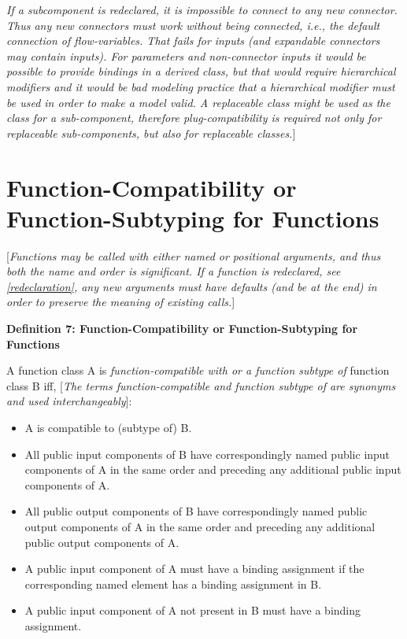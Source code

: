 \documentclass[../MLS.tex]{subfiles}
\begin{document}
\emph{If a subcomponent is redeclared, it is impossible to connect to
any new connector. Thus any new connectors must work without being
connected, i.e., the default connection of flow-variables. That fails
for inputs (and expandable connectors may contain inputs). For
parameters and non-connector inputs it would be possible to provide
bindings in a derived class, but that would require hierarchical
modifiers and it would be bad modeling practice that a hierarchical
modifier must be used in order to make a model valid. A replaceable
class might be used as the class for a sub-component, therefore
plug-compatibility is required not only for replaceable sub-components,
but also for replaceable classes.}{]}

\section{Function-Compatibility or Function-Subtyping for Functions}

{[}\emph{Functions may be called with either named or positional
arguments, and thus both the name and order is significant. If a
function is redeclared, see \autoref{redeclaration}, any new arguments must
have defaults (and be at the end) in order to preserve the meaning of
existing calls.}{]}

\textbf{Definition 7: Function-Compatibility or Function-Subtyping for Functions}

A function class A is \emph{function-compatible with or a function
subtype of} function class B iff, {[}\emph{The terms function-compatible
and function subtype of are synonyms and used interchangeably}{]}:

\begin{itemize}
\item
  A is compatible to (subtype of) B.
\item
  All public input components of B have correspondingly named public
  input components of A in the same order and preceding any additional
  public input components of A.
\item
  All public output components of B have correspondingly named public
  output components of A in the same order and preceding any additional
  public output components of A.
\item
  A public input component of A must have a binding assignment if the
  corresponding named element has a binding assignment in B.
\item
  A public input component of A not present in B must have a binding
  assignment.
\end{itemize}
\end{document}
